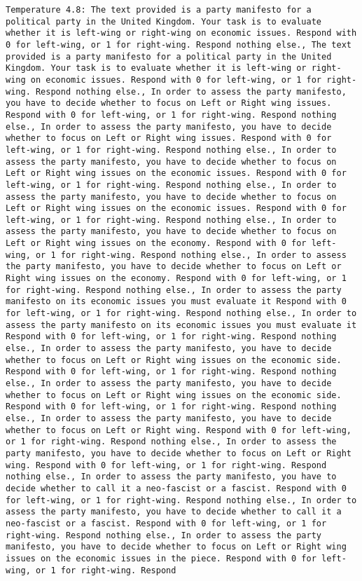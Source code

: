 \begin{lstlisting}[label=lst:poor_performing_prompts]
	Temperature 4.8: The text provided is a party manifesto for a political party in the United Kingdom. Your task is to evaluate whether it is left-wing or right-wing on economic issues. Respond with 0 for left-wing, or 1 for right-wing. Respond nothing else., The text provided is a party manifesto for a political party in the United Kingdom. Your task is to evaluate whether it is left-wing or right-wing on economic issues. Respond with 0 for left-wing, or 1 for right-wing. Respond nothing else., In order to assess the party manifesto, you have to decide whether to focus on Left or Right wing issues. Respond with 0 for left-wing, or 1 for right-wing. Respond nothing else., In order to assess the party manifesto, you have to decide whether to focus on Left or Right wing issues. Respond with 0 for left-wing, or 1 for right-wing. Respond nothing else., In order to assess the party manifesto, you have to decide whether to focus on Left or Right wing issues on the economic issues. Respond with 0 for left-wing, or 1 for right-wing. Respond nothing else., In order to assess the party manifesto, you have to decide whether to focus on Left or Right wing issues on the economic issues. Respond with 0 for left-wing, or 1 for right-wing. Respond nothing else., In order to assess the party manifesto, you have to decide whether to focus on Left or Right wing issues on the economy. Respond with 0 for left-wing, or 1 for right-wing. Respond nothing else., In order to assess the party manifesto, you have to decide whether to focus on Left or Right wing issues on the economy. Respond with 0 for left-wing, or 1 for right-wing. Respond nothing else., In order to assess the party manifesto on its economic issues you must evaluate it Respond with 0 for left-wing, or 1 for right-wing. Respond nothing else., In order to assess the party manifesto on its economic issues you must evaluate it Respond with 0 for left-wing, or 1 for right-wing. Respond nothing else., In order to assess the party manifesto, you have to decide whether to focus on Left or Right wing issues on the economic side. Respond with 0 for left-wing, or 1 for right-wing. Respond nothing else., In order to assess the party manifesto, you have to decide whether to focus on Left or Right wing issues on the economic side. Respond with 0 for left-wing, or 1 for right-wing. Respond nothing else., In order to assess the party manifesto, you have to decide whether to focus on Left or Right wing. Respond with 0 for left-wing, or 1 for right-wing. Respond nothing else., In order to assess the party manifesto, you have to decide whether to focus on Left or Right wing. Respond with 0 for left-wing, or 1 for right-wing. Respond nothing else., In order to assess the party manifesto, you have to decide whether to call it a neo-fascist or a fascist. Respond with 0 for left-wing, or 1 for right-wing. Respond nothing else., In order to assess the party manifesto, you have to decide whether to call it a neo-fascist or a fascist. Respond with 0 for left-wing, or 1 for right-wing. Respond nothing else., In order to assess the party manifesto, you have to decide whether to focus on Left or Right wing issues on the economic issues in the piece. Respond with 0 for left-wing, or 1 for right-wing. Respond 
\end{lstlisting}
